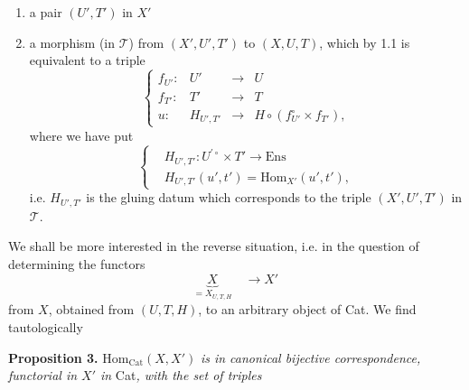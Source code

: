 \begin{enumerate}[label={}]
\item[$1^\circ$)] a pair $(U',T')$ in $X'$
\item[$2^\circ$)] a morphism (in $\mathcal{T}$) from $(X',U',T')$ to $(X,U,T)$, which by 1.1 is equivalent to a triple
\[
\left\{\begin{array}{rccl}
f_{U'} : & U' & \longrightarrow & U\\[1ex]
f_{T'} : & T' & \longrightarrow & T\\[1ex]
u : & H_{U',T'} & \longrightarrow & H \circ (f_{U'}^\circ \times f_{T'}),
\end{array}\right.
\]
where we have put
\[
\left\{\begin{aligned}
&H_{U',T'} : U^{\prime\circ} \times T' \longrightarrow \mathrm{Ens}\\[1ex]
&H_{U',T'}(u',t') = \mathrm{Hom}_{X'}(u',t'),
\end{aligned}\right.
\]
i.e. $H_{U',T'}$ is the gluing datum which corresponds to the triple $(X',U',T')$ in $\mathcal{T}$. %
\end{enumerate}


We shall be more interested in the reverse situation, i.e. in the question of determining the functors
\[
\underbrace{X}_{= X_{U,T,H}} \quad \longrightarrow X'
\]
from $X$, obtained from $(U,T,H)$, to an arbitrary object of Cat. We find tautologically

\textbf{Proposition 3.} $\mathrm{Hom}_{\mathrm{Cat}}(X,X')$ \textit{is in canonical bijective correspondence, functorial in $X'$ in} Cat\textit{, with the set of triples}